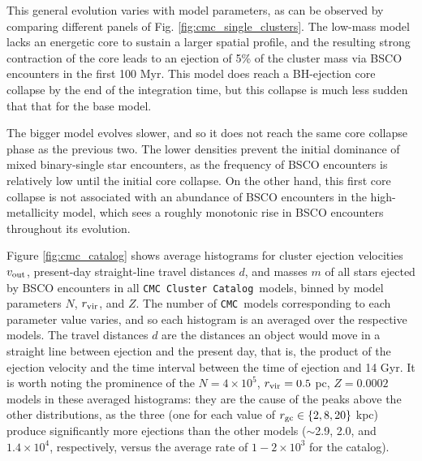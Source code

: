 \documentclass[twocolumn]{aastex631}
\newcommand{\CMC}{\texttt{CMC}}
\newcommand{\CMCcat}{\texttt{CMC Cluster Catalog}}
\begin{document}
This general evolution varies with model parameters, as can be observed by comparing different panels of Fig. \ref{fig:cmc_single_clusters}.
The low-mass model lacks an energetic core to sustain a larger spatial profile, and the resulting strong contraction of the core leads to an ejection of 5\% of the cluster mass via BSCO encounters in the first 100 Myr.
This model does reach a BH-ejection core collapse by the end of the integration time, but this collapse is much less sudden that that for the base model.

The bigger model evolves slower, and so it does not reach the same core collapse phase as the previous two.
The lower densities prevent the initial dominance of mixed binary-single star encounters, as the frequency of BSCO encounters is relatively low until the initial core collapse.
On the other hand, this first core collapse is not associated with an abundance of BSCO encounters in the high-metallicity model, which sees a roughly monotonic rise in BSCO encounters throughout its evolution.

Figure \ref{fig:cmc_catalog} shows average histograms for cluster ejection velocities $v_{\rm out}$, present-day straight-line travel distances $d$, and masses $m$ of all stars ejected by BSCO encounters in all \CMCcat\ models, binned by model parameters $N$, $r_{\rm vir}$, and $Z$.
The number of \CMC\ models corresponding to each parameter value varies, and so each histogram is an averaged over the respective models.
The travel distances $d$ are the distances an object would move in a straight line between ejection and the present day, that is, the product of the ejection velocity and the time interval between the time of ejection and 14 Gyr.
It is worth noting the prominence of the $N = 4\times10^5$, $r_{\rm vir} = 0.5$ pc, $Z = 0.0002$ models in these averaged histograms: they are the cause of the peaks above the other distributions, as the three (one for each value of $r_{\rm gc} \in \{2, 8, 20\}$ kpc) produce significantly more ejections than the other models ($\sim$2.9, 2.0, and $1.4 \times 10^4$, respectively, versus the average rate of $1-2 \times 10^3$ for the catalog).

\end{document}
